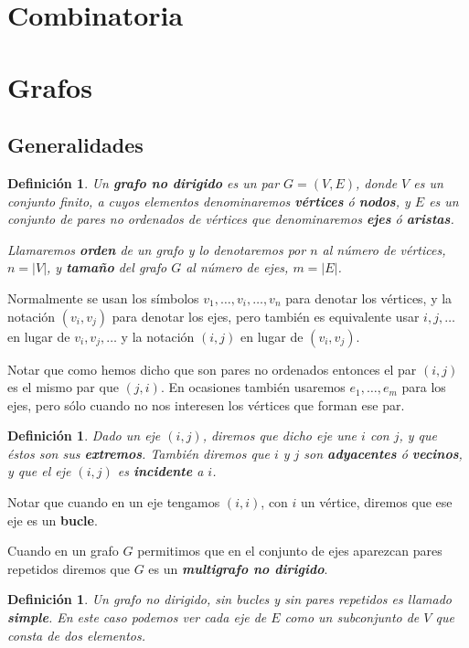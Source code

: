 \documentclass[12pt]{article}
\newtheorem{definition}[theorem]{Definición}
\begin{document}
\section{Combinatoria}
\section{Grafos}
\subsection{Generalidades}
\begin{definition} Un \textbf{grafo no dirigido} es un par $G = (V,E)$, donde $V$ es un conjunto finito, a cuyos elementos denominaremos \textbf{vértices} ó \textbf{nodos}, y $E$ es un conjunto de pares no ordenados de vértices que denominaremos \textbf{ejes} ó \textbf{aristas}.

Llamaremos \textbf{orden} de un grafo y lo denotaremos por $n$ al número de vértices, $n = |V|$, y \textbf{tamaño} del grafo $G$ al número de ejes, $m = |E|$.
\end{definition}

Normalmente se usan los símbolos $v_1, \ldots, v_i, \ldots, v_n$ para denotar los vértices, y la notación $(v_i, v_j)$ para denotar los ejes, pero también es equivalente usar $i,j, \ldots$ en lugar de $v_i, v_j, \ldots$ y la notación $(i,j)$ en lugar de $(v_i,v_j)$. 

Notar que como hemos dicho que son pares no ordenados entonces el par $(i,j)$ es el mismo par que $(j,i)$. En ocasiones también usaremos $e_1, \ldots, e_m$ para los ejes, pero sólo cuando no nos interesen los vértices que forman ese par. 

\begin{definition} Dado un eje $(i,j)$, diremos que dicho eje une $i$ con $j$, y que éstos son sus \textbf{extremos}. También diremos que $i$ y $j$ son \textbf{adyacentes} ó \textbf{vecinos}, y que el eje $(i,j)$ es \textbf{incidente} a $i$.
\end{definition} 

Notar que cuando en un eje tengamos $(i,i)$, con $i$ un vértice, diremos que ese eje es un \textbf{bucle}. 

Cuando en un grafo $G$ permitimos que en el conjunto de ejes aparezcan pares repetidos diremos que $G$ es un \textbf{\textit{multigrafo no dirigido}}.

\begin{definition}Un grafo no dirigido, sin bucles y sin pares repetidos es llamado \textbf{simple}. En este caso podemos ver cada eje de $E$ como un subconjunto de $V$ que consta de dos elementos.
\end{definition}
\end{document}
